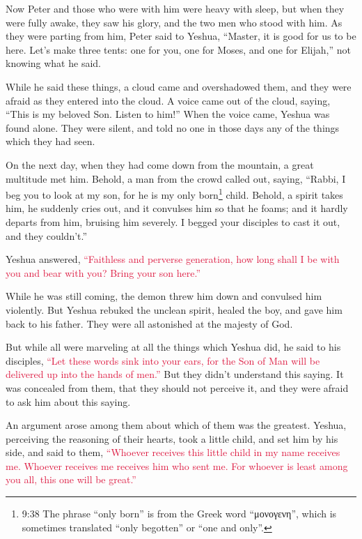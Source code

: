 \myverse{}Now Peter and those who were with him were heavy with sleep,
but when they were fully awake, they saw his glory, and the two men who stood with him.
\myverse{}As they were parting from him, Peter said to Yeshua, “Master, it is good for
us to be here. Let’s make three tents: one for you, one for Moses, and one for Elijah,” not knowing what
he said.

\myverse{}While he said these things, a cloud came and overshadowed them,
and they were afraid as they entered into the cloud.
\myverse{}A voice came out of the cloud, saying, “This is my beloved Son. Listen to
him!”
\myverse{}When the voice came, Yeshua was found alone. They were silent, and told no
one in those days any of the things which they had seen.

\myverse{}On the next day, when they had come down from the mountain, a
great multitude met him.
\myverse{}Behold, a man from the crowd called out, saying, “Rabbi, I beg you to look
at my son, for he is my only born\footnote{9:38 The phrase “only born” is from the Greek word “μονογενη”, which is sometimes translated “only
	begotten” or “one and only”.} child.
\myverse{}Behold, a spirit takes him, he suddenly cries out, and it convulses him so
that he foams; and it hardly departs from him, bruising him severely.
\myverse{}I begged your disciples to cast it out, and they couldn’t.”

\myverse{}Yeshua answered,
\textcolor{crimson}{“Faithless and perverse generation, how long shall I be with you and bear with you? Bring your son
	here.”}

\myverse{}While he was still coming, the demon threw him down and convulsed
him violently. But Yeshua rebuked the unclean spirit, healed the boy, and gave him back to his father.
\myverse{}They were all astonished at the majesty of God.

But while all were marveling at all the things which Yeshua did, he said to his disciples,
\myverse{}\textcolor{crimson}{“Let these words sink into your ears, for the Son of Man will be delivered
	up into the hands of men.”}
\myverse{}But they didn’t understand this saying. It was concealed from them, that they
should not perceive it, and they were afraid to ask him about this saying.

\myverse{}An argument arose among them about which of them was the greatest.
\myverse{}Yeshua, perceiving the reasoning of their hearts, took a little child, and
set him by his side,
\myverse{}and said to them,
\textcolor{crimson}{“Whoever receives this little child in my name receives me. Whoever receives me receives him who sent
	me. For whoever is least among you all, this one will be great.”}

